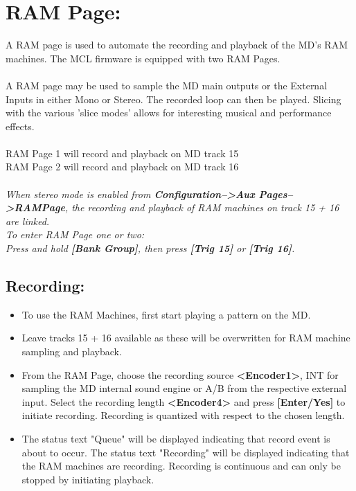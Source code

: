 \chapter{RAM Page:}
A RAM page is used to automate the recording and playback of the MD's RAM machines. The MCL firmware is equipped with two RAM Pages.
\\\\
A RAM page may be used to sample the MD main outputs or the External Inputs in either Mono or Stereo. The recorded loop can then be played.
Slicing with the various 'slice modes' allows for interesting musical and performance effects.
\\\\
RAM Page 1 will record and playback on MD track 15\\
RAM Page 2 will record and playback on MD track 16\\
\\
\textit{When stereo mode is enabled from \textbf{Configuration-->Aux Pages-->RAMPage}, the recording and playback of RAM machines on track 15 + 16 are linked.}
\\
\textit{To enter RAM Page one or two: \\Press and hold
\textbf{[Bank Group]}, then press \textbf{[Trig 15]} or \textbf{[Trig 16]}.}

\newpage
\section{Recording:}
\begin{itemize}
    \item{To use the RAM Machines, first start playing a pattern on the MD.}
    \item{Leave tracks 15 + 16 available as these will be overwritten for RAM machine sampling and playback.}
    \item{From the RAM Page, choose the recording source \textbf{<Encoder1>}, INT for sampling the MD internal sound engine or A/B from the respective external input. Select the recording length \textbf{<Encoder4>} and press \textbf{[Enter/Yes]} to initiate recording. Recording is quantized with respect to the chosen length.}
    \item The status text "Queue" will be displayed indicating that record event is about to occur. The status text "Recording" will be displayed indicating that the RAM machines are recording. Recording is continuous and can only be stopped by initiating playback.
\end{itemize}

